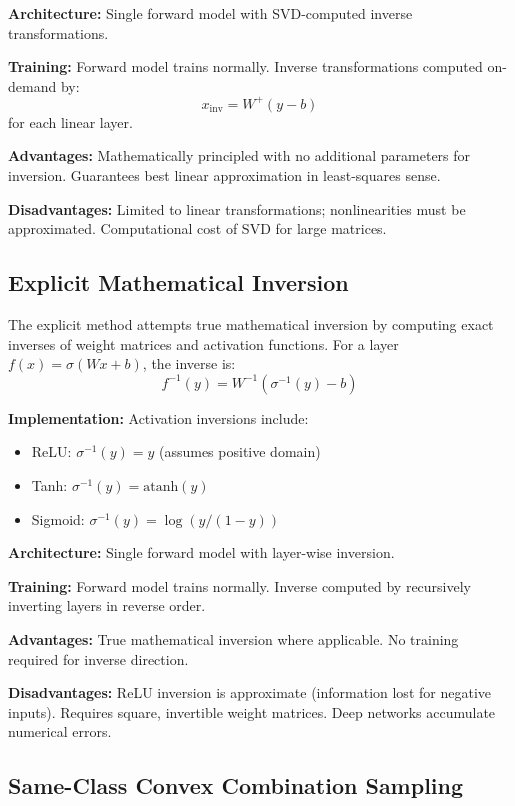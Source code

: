 \documentclass[sigconf]{acmart}
\begin{document}
\textbf{Architecture:} Single forward model with SVD-computed inverse transformations.

\textbf{Training:} Forward model trains normally. Inverse transformations computed on-demand by:
\begin{equation}
x_{\text{inv}} = W^+(y - b)
\end{equation}
for each linear layer.

\textbf{Advantages:} Mathematically principled with no additional parameters for inversion. Guarantees best linear approximation in least-squares sense.

\textbf{Disadvantages:} Limited to linear transformations; nonlinearities must be approximated. Computational cost of SVD for large matrices.

\subsection{Explicit Mathematical Inversion}

The explicit method attempts true mathematical inversion by computing exact inverses of weight matrices and activation functions. For a layer $f(x) = \sigma(Wx + b)$, the inverse is:
\begin{equation}
f^{-1}(y) = W^{-1}(\sigma^{-1}(y) - b)
\end{equation}

\textbf{Implementation:} Activation inversions include:
\begin{itemize}
    \item ReLU: $\sigma^{-1}(y) = y$ (assumes positive domain)
    \item Tanh: $\sigma^{-1}(y) = \text{atanh}(y)$  
    \item Sigmoid: $\sigma^{-1}(y) = \log(y/(1-y))$
\end{itemize}

\textbf{Architecture:} Single forward model with layer-wise inversion.

\textbf{Training:} Forward model trains normally. Inverse computed by recursively inverting layers in reverse order.

\textbf{Advantages:} True mathematical inversion where applicable. No training required for inverse direction.

\textbf{Disadvantages:} ReLU inversion is approximate (information lost for negative inputs). Requires square, invertible weight matrices. Deep networks accumulate numerical errors.

\subsection{Same-Class Convex Combination Sampling}
\end{document}
